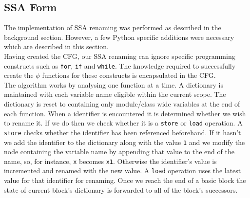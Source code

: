 \documentclass[12pt, titlepage]{article}
\begin{document}
\subsection{SSA Form}
The implementation of SSA renaming was performed as described in the background section. However, a few Python specific additions were necessary which are described in this section. \\
\indent Having created the CFG, our SSA renaming can ignore specific programming constructs such as \texttt{for}, \texttt{if} and \texttt{while}. The knowledge required to successfully create the $\phi$ functions for these constructs is encapsulated in the CFG. \\
\indent The algorithm works by analysing one function at a time. A dictionary is maintained with each variable name eligible within the current scope. The dictionary is reset to containing only module/class wide variables at the end of each function. When a identifier is encountered it is determined whether we wish to rename it. If we do then we check whether it is a \texttt{store} or \texttt{load} operation. A \texttt{store} checks whether the identifier has been referenced beforehand. If it hasn't we add the identifier to the dictionary along with the value \texttt{1} and we modify the node containing the variable name by appending that value to the end of the name, so, for instance, \texttt{x} becomes \texttt{x1}. Otherwise the identifier's value is incremented and renamed with the new value. A \texttt{load} operation uses the latest value for that identifier for renaming. Once we reach the end of a basic block the state of current block's dictionary is forwarded to all of the block's successors.
\end{document}
